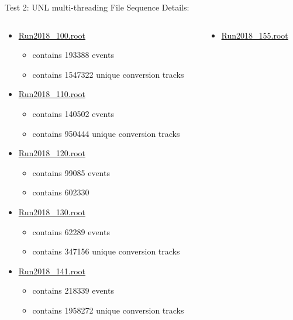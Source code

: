 \documentclass[10pt]{beamer}
\begin{document}
\begin{frame}{Test 2: UNL multi-threading}
File Sequence Details:\\
\begin{columns}
	\begin{column}{0.5\textwidth}
\scriptsize
\begin{itemize}
    \item \url{Run2018_100.root} 
         \begin{itemize}
         	\scriptsize
      		\item   contains 193388 events
       		\item  contains 1547322 unique conversion tracks
        \end{itemize}
   \item \url{Run2018_110.root}
        \begin{itemize}
        \scriptsize
     		 \item   contains 140502 events
     		\item   contains 950444 unique conversion tracks
        \end{itemize}
   \item \url{Run2018_120.root}
        \begin{itemize}
        \scriptsize
      		 \item  contains 99085 events
      		 \item  contains 602330
        \end{itemize}
    \item \url{Run2018_130.root} 
        \begin{itemize}
        \scriptsize
       		\item  contains 62289 events
       		\item  contains 347156 unique conversion tracks
        \end{itemize}
   \item \url{Run2018_141.root}
        \begin{itemize}
        \scriptsize
      		\item  contains 218339 events
       		\item  contains 1958272 unique conversion tracks
        \end{itemize}
        \end{itemize}
        \end{column}
        \begin{column}{0.5\textwidth}
	\scriptsize
		\begin{itemize}
   \item \url{Run2018_155.root}

\end{itemize}
\end{column}
\end{columns}
\end{frame}
\end{document}
